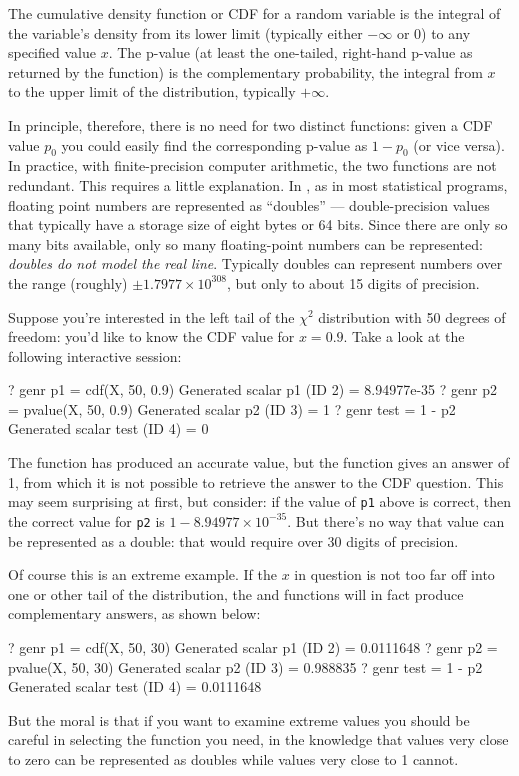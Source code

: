 The cumulative density function or CDF for a random variable
is the integral of the variable's density from its lower limit
(typically either $-\infty$ or 0) to any specified value $x$.  The
p-value (at least the one-tailed, right-hand p-value as returned by
the  function) is the complementary probability, the
integral from $x$ to the upper limit of the distribution, typically
$+\infty$.  

In principle, therefore, there is no need for two distinct functions:
given a CDF value $p_0$ you could easily find the corresponding
p-value as $1-p_0$ (or vice versa).  In practice, with
finite-precision computer arithmetic, the two functions are not
redundant.  This requires a little explanation.  In , as in
most statistical programs, floating point numbers are represented as
``doubles'' --- double-precision values that typically have a storage
size of eight bytes or 64 bits.  Since there are only so many bits
available, only so many floating-point numbers can be represented:
\textit{doubles do not model the real line}.  Typically doubles can
represent numbers over the range (roughly) $\pm 1.7977 \times
10^{308}$, but only to about 15 digits of precision.

Suppose you're interested in the left tail of the $\chi^2$ distribution
with 50 degrees of freedom: you'd like to know the CDF value for $x =
0.9$.  Take a look at the following interactive session: 
\begin{code}
? genr p1 = cdf(X, 50, 0.9)
Generated scalar p1 (ID 2) = 8.94977e-35
? genr p2 = pvalue(X, 50, 0.9)
Generated scalar p2 (ID 3) = 1
? genr test = 1 - p2
Generated scalar test (ID 4) = 0
\end{code}

The  function has produced an accurate value, but the
 function gives an answer of 1, from which it is not
possible to retrieve the answer to the CDF question.  This may seem
surprising at first, but consider: if the value of \texttt{p1} above
is correct, then the correct value for \texttt{p2} is $1 - 8.94977
\times 10^{-35}$.  But there's no way that value can be represented as
a double: that would require over 30 digits of precision.

Of course this is an extreme example.  If the $x$ in question is not
too far off into one or other tail of the distribution, the 
and  functions will in fact produce complementary
answers, as shown below:
\begin{code}
? genr p1 = cdf(X, 50, 30)
Generated scalar p1 (ID 2) = 0.0111648
? genr p2 = pvalue(X, 50, 30)
Generated scalar p2 (ID 3) = 0.988835
? genr test = 1 - p2
Generated scalar test (ID 4) = 0.0111648
\end{code}
But the moral is that if you want to examine extreme values
you should be careful in selecting the function you need, in the
knowledge that values very close to zero can be represented as doubles
while values very close to 1 cannot.


